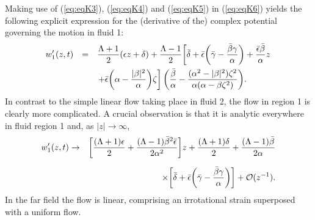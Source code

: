 \documentclass{article}
\begin{document}
Making use of (\ref{eq:eqK3}), (\ref{eq:eqK4}) and (\ref{eq:eqK5})
in (\ref{eq:eqK6}) yields the following explicit expression for the (derivative
of the) complex potential governing the motion in fluid 1:
\begin{equation}
\begin{array}{rcl}
\displaystyle w_1'(z,t) & \displaystyle=&\displaystyle {\Lambda+1 \over 2} (\epsilon z + \delta)+{\Lambda-1 \over 2} {\left[\vphantom{+\bar \epsilon {\left(\alpha -{|\beta|^2 \over \alpha} \right )} \zeta}\bar \delta +
\bar \epsilon {\left(\bar \gamma - {\bar \beta \gamma \over \alpha} \right)}+ {\bar \epsilon \bar \beta \over \alpha} z\right.}\nonumber\\[10pt] 
&&\displaystyle\left.+\bar \epsilon {\left( \alpha -{|\beta|^2 \over \alpha} \right )} \zeta\right]{\left({\bar \beta \over \alpha} -{(\alpha^2 -|\beta|^2) \zeta^2 \over\alpha( \alpha - \beta \zeta^2)} \right )}. \label{eq:eqW1}
\end{array}\end{equation}
In contrast to the simple linear flow taking place in fluid 2,
the flow in region 1 is clearly more complicated.
A crucial observation is that it is analytic
everywhere in fluid region 1 and, as $|z| \to \infty$,
\begin{eqnarray}
w_1'(z,t) &\to& {\left[ {(\Lambda + 1) \epsilon \over 2} + 
{(\Lambda - 1) \bar \beta^2 \bar \epsilon \over 2 \alpha^2} \right ]} z
+ {(\Lambda +1) \delta \over 2}+
{(\Lambda -1) \bar \beta \over 2 \alpha}\nonumber\\[6pt]
&&\quad\times{\left[\bar \delta + {\bar \epsilon}
{\left( \bar \gamma - {\bar \beta \gamma
\over \alpha} \right)} \right]}
+ {\cal O}(z^{-1}).\label{eq:eqFF}
\end{eqnarray}
In the far field the flow is linear, comprising an irrotational strain superposed with a uniform flow.
\end{document}
